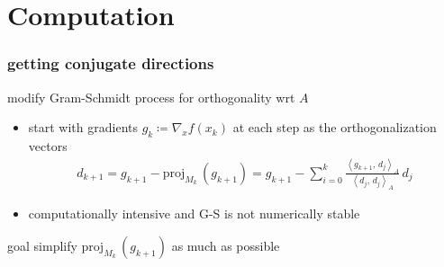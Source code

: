 \documentclass[10pt,dvipsnames*]{beamer}
\begin{document}
\section{Computation}%
\label{sec:computation}
%
\begin{frame}
  \frametitle{getting conjugate directions}
  \pause
  \begin{block}{modify Gram-Schmidt process for orthogonality wrt $A$}
    \begin{itemize}
      \item start with gradients $g_k \coloneqq \nabla_x f(x_k)$ at each step as the orthogonalization vectors
      \begin{align}
        \label{eq:A-conjugate}
        d_{k+1} = g_{k+1} - \mathrm{proj}_{M_k}\,(g_{k+1}) = g_{k+1} - \sum_{i=0}^k \frac{\left\langle g_{k+1},\, d_j \right\rangle_A} {\left\langle d_j,\, d_j \right\rangle_A} \, d_j
      \end{align}
      \item computationally intensive and G-S is not numerically stable
    \end{itemize}
  \end{block}
  \pause
  \begin{block}{goal}
    simplify $\mathrm{proj}_{M_k}\,(g_{k+1})$ as much as possible \cite{zibulevsky_lectures}
  \end{block}
\end{frame}
%
\end{document}
